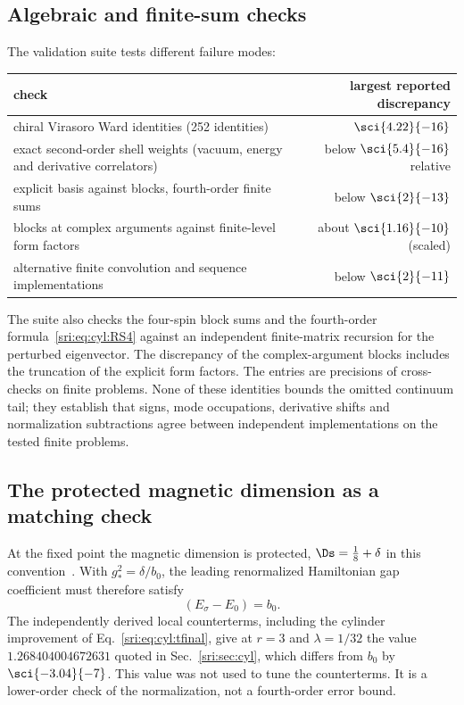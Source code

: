 \subsection{Algebraic and finite-sum checks}\label{sri:app:cyl:checks}
The validation suite tests different failure modes:
\begin{center}\small
\begin{tabular}{@{}>{\raggedright\arraybackslash}p{}r@{}}
\toprule
check & largest reported discrepancy\\
\midrule
chiral Virasoro Ward identities (252 identities) & $\sci{4.22}{-16}$\\
exact second-order shell weights (vacuum, energy and derivative correlators) & below $\sci{5.4}{-16}$ relative\\
explicit basis against blocks, fourth-order finite sums & below $\sci{2}{-13}$\\
blocks at complex arguments against finite-level form factors & about $\sci{1.16}{-10}$ (scaled)\\
alternative finite convolution and sequence implementations & below $\sci{2}{-11}$\\
\bottomrule
\end{tabular}
\end{center}
The suite also checks the four-spin block sums and the fourth-order formula~\eqref{sri:eq:cyl:RS4} against an independent
finite-matrix recursion for the perturbed eigenvector. The discrepancy of the complex-argument blocks includes the
truncation of the explicit form factors. The entries are precisions of cross-checks on finite problems. None of these
identities bounds the omitted continuum tail; they establish that signs, mode occupations, derivative shifts and
normalization subtractions agree between independent implementations on the tested finite problems.

\subsection{The protected magnetic dimension as a matching check}\label{sri:app:cyl:magnetic}
At the fixed point the magnetic dimension is protected, $\Ds=\frac18+\delta$ in this
convention~\cite{sri:Behan:2017emf}. With $g_*^2=\delta/b_0$, the leading renormalized Hamiltonian gap coefficient must
therefore satisfy
\begin{equation}
 [g^2](E_\sigma-E_0)=b_0.
\end{equation}
The independently derived local counterterms, including the cylinder improvement of Eq.~\eqref{sri:eq:cyl:tfinal}, give at
$r=3$ and $\lambda=1/32$ the value $1.268404004672631$ quoted in Sec.~\ref{sri:sec:cyl}, which differs from $b_0$ by
$\sci{-3.04}{-7}$. This value was not used to tune the counterterms. It is a lower-order check of the normalization,
not a fourth-order error bound.

